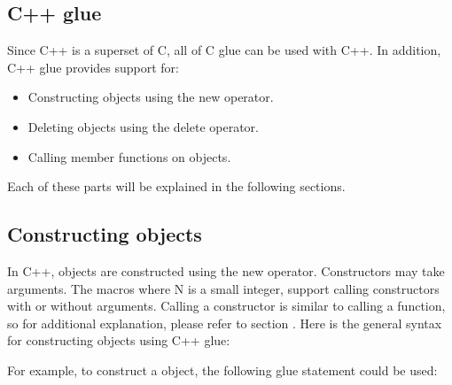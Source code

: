 \documentclass[letterpaper,10pt,english]{sphinxmanual}
\begin{document}
\newpage

\subsection{C++ glue}
\label{\detokenize{vmref:id2}}
Since C++ is a superset of C, all of C glue can be used with C++. In addition, C++ glue provides
support for:
\begin{itemize}
\item {} 
Constructing objects using the new operator.

\item {} 
Deleting objects using the delete operator.

\item {} 
Calling member functions on objects.

\end{itemize}

Each of these parts will be explained in the following sections.


\subsection{Constructing objects}
\label{\detokenize{vmref:index-79}}\label{\detokenize{vmref:constructing-objects}}
In C++, objects are constructed using the new operator. Constructors may take arguments. The
macros  where N is a small integer, support calling constructors with or without arguments.
Calling a constructor is similar to calling a function, so for additional explanation, please
refer to section {\hyperref[\detokenize{vmref:calling-c-functions}]{}}. Here is the general syntax for constructing objects using C++ glue:

\begin{sphinxVerbatim}[commandchars=\\\{\}]
      
\end{sphinxVerbatim}

For example, to construct a  object, the following glue statement could be used:
\end{document}
